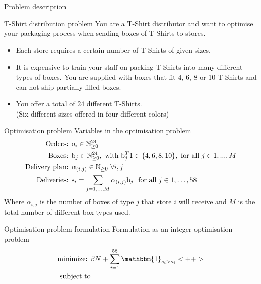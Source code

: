 \begin{frame}{Problem description}
    \begin{block}{T-Shirt distribution problem}
        You are a T-Shirt distributor and want to optimise your packaging
        process when sending boxes of T-Shirts to stores.
        \begin{itemize}
            \item Each store requires a
            certain number of T-Shirts of given sizes.
            \item It is expensive to train your staff on packing T-Shirts into many
            different types of boxes. You are supplied with boxes that fit 4, 6, 8
            or 10 T-Shirts and can not ship partially filled boxes.
            \item You offer a total of $24$ different T-Shirts.\\
                \hfill(Six different sizes offered in four different colors)
        \end{itemize}
    \end{block}
\end{frame}

\begin{frame}{Optimisation problem}
    Variables in the optimisation problem
    \begin{align*}
        \text{Orders: }& \text{o}_i \in \mathbb{N}_{\geq 0}^{24}\\
        \text{Boxes: }& \text{b}_j \in \mathbb{N}_{\geq 0}^{24}, \text{ with }
        \text{b}_j^T 1 \in \{4, 6, 8, 10\}, \text{ for all } j \in 1,...,M\\
        \text{Delivery plan: }& \alpha_{(i,j)}\in \mathbb{N}_{\geq 0}~ \forall i, j\\
        \text{Deliveries: }& \text{s}_i =
        \sum_{j = 1,\dots,M}\alpha_{(i,j)}\text{b}_j~\text{ for all } j \in 1,\dots,58\\
    \end{align*}
    Where $\alpha_{i,j}$ is the number of boxes of type $j$ that store $i$ will
    receive and $M$ is the total number of different box-types used.
\end{frame}

\begin{frame}{Optimisation problem formulation}
    Formulation as an integer optimisation problem
    \begin{align*}
        \text{minimize: } & \beta N + \sum_{i = 1}^{58} \mathbbm{1}_{s_i > o_i}<++>\\
        \text{subject to}
    \end{align*}
\end{frame}
